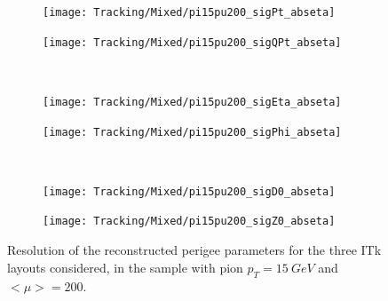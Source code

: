 \documentclass[a4paper,twoside,12pt]{article}
\begin{document}
\begin{figure}
\begin{subfigure}{.5\linewidth}
\texttt{[image: Tracking/Mixed/pi15pu200\_sigPt\_abseta]}
\caption{}
\label{fig:tracking:pi15pu200_sigPt_abseta}
\end{subfigure}
\begin{subfigure}{.5\linewidth}
\texttt{[image: Tracking/Mixed/pi15pu200\_sigQPt\_abseta]}
\caption{}
\label{fig:tracking:pi15pu200_sigQPt_abseta}
\end{subfigure}\\[1ex]
\begin{subfigure}{.5\linewidth}
\texttt{[image: Tracking/Mixed/pi15pu200\_sigEta\_abseta]}
\caption{}
\label{fig:tracking:pi15pu200_sigEta_abseta}
\end{subfigure}
\begin{subfigure}{.5\linewidth}
\texttt{[image: Tracking/Mixed/pi15pu200\_sigPhi\_abseta]}
\caption{}
\label{fig:tracking:pi15pu200_sigPhi_abseta}
\end{subfigure}\\[1ex]
\begin{subfigure}{.5\linewidth}
\texttt{[image: Tracking/Mixed/pi15pu200\_sigD0\_abseta]}
\caption{}
\label{fig:tracking:pi15pu200_sigD0_abseta}
\end{subfigure}
\begin{subfigure}{.5\linewidth}
\texttt{[image: Tracking/Mixed/pi15pu200\_sigZ0\_abseta]}
\caption{}
\label{fig:tracking:pi15pu200_sigZ0_abseta}
\end{subfigure}
\caption{Resolution of the reconstructed perigee parameters for the three ITk layouts considered, in the sample with pion $p_{T} = 15\ GeV$ and $<\mu> = 200$.}
\label{fig:tracking:pionResolution}
\end{figure}
\end{document}
